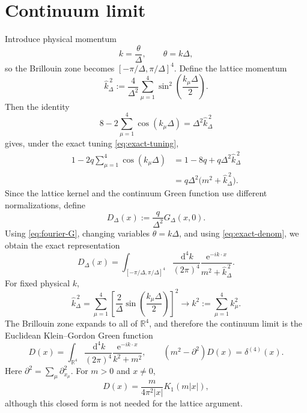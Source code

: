 \documentclass[11pt]{article}
\newcommand{\R}{\mathbb R}
\newcommand{\e}{\mathrm e}
\newcommand{\dd}{\,\mathrm d}
\begin{document}
	\section{Continuum limit}
	Introduce physical momentum
	\[
	k=\frac{\theta}{\Delta},
	\qquad
	\theta=k\Delta,
	\]
	so the Brillouin zone becomes $[-\pi/\Delta,\pi/\Delta]^4$. Define the lattice momentum
	\begin{equation}
		\label{eq:khat}
		\widehat k_\Delta^{\,2}
		:=\frac4{\Delta^2}\sum_{\mu=1}^4
		\sin^2\!\left(\frac{k_\mu\Delta}{2}\right).
	\end{equation}
	Then the identity
	\[
	8-2\sum_{\mu=1}^4\cos(k_\mu\Delta)
	=\Delta^2\widehat k_\Delta^{\,2}
	\]
	gives, under the exact tuning \eqref{eq:exact-tuning},
	\begin{align}
		1-2q\sum_{\mu=1}^4\cos(k_\mu\Delta)
		&=1-8q+q\Delta^2\widehat k_\Delta^{\,2} \\
		&=q\Delta^2\bigl(m^2+\widehat k_\Delta^{\,2}\bigr).
		\label{eq:exact-denom}
	\end{align}
	Since the lattice kernel and the continuum Green function use different normalizations, define
	\begin{equation}
		\label{eq:Ddelta}
		D_\Delta(x):=\frac{q}{\Delta^2}G_\Delta(x,0).
	\end{equation}
	Using \eqref{eq:fourier-G}, changing variables $\theta=k\Delta$, and using \eqref{eq:exact-denom}, we obtain the exact representation
	\begin{equation}
		\label{eq:Ddelta-fourier}
		D_\Delta(x)
		=\int_{[-\pi/\Delta,\pi/\Delta]^4}
		\frac{\dd^4k}{(2\pi)^4}
		\frac{\e^{-ik\cdot x}}
		{m^2+\widehat k_\Delta^{\,2}}.
	\end{equation}
	For fixed physical $k$,
	\[
	\widehat k_\Delta^{\,2}
	=\sum_{\mu=1}^4\left[
	\frac{2}{\Delta}\sin\!\left(\frac{k_\mu\Delta}{2}\right)
	\right]^2
	\longrightarrow k^2:=\sum_{\mu=1}^4k_\mu^2.
	\]
	The Brillouin zone expands to all of $\R^4$, and therefore the continuum limit is the Euclidean Klein--Gordon Green function
	\begin{equation}
		\label{eq:continuum-propagator}
		\boxed{
			D(x)=\int_{\R^4}\frac{\dd^4k}{(2\pi)^4}
			\frac{\e^{-ik\cdot x}}{k^2+m^2},
			\qquad
			(m^2-\partial^2)D(x)=\delta^{(4)}(x).
		}
	\end{equation}
	Here $\partial^2=\sum_\mu\partial_{x_\mu}^2$. For $m>0$ and $x\neq0$,
	\[
	D(x)=\frac{m}{4\pi^2|x|}K_1(m|x|),
	\]
	although this closed form is not needed for the lattice argument.
	
\end{document}
